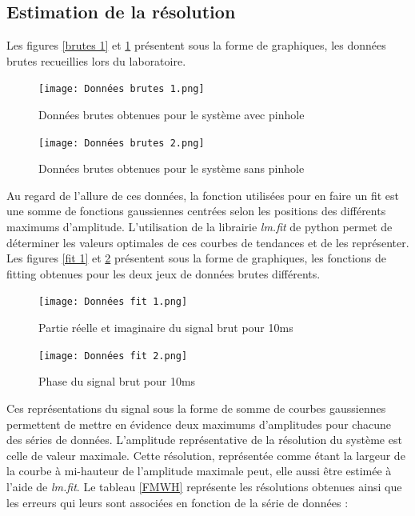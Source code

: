 \documentclass[11pt,letterpaper]{article}
\begin{document}
\subsection{Estimation de la résolution}

Les figures \ref{brutes 1} et \ref{brutes 2} présentent sous la forme de graphiques, les données brutes recueillies lors du laboratoire. 

\begin{figure}[h!]
    \centering
    \begin{minipage}[t]{0.46\linewidth}
        \centering
        \texttt{[image: Données brutes 1.png]}
        \caption{Données brutes obtenues pour le système avec pinhole}
        \label{brutes 1}
    \end{minipage}\hfill
    \begin{minipage}[t]{0.5\linewidth}
        \centering
        \texttt{[image: Données brutes 2.png]}
        \caption{Données brutes obtenues pour le système sans pinhole}
        \label{brutes 2}
    \end{minipage}

\end{figure}

Au regard de l'allure de ces données, la fonction utilisées pour en faire un fit est une somme de fonctions gaussiennes centrées selon les positions des différents maximums d'amplitude. L'utilisation de la librairie \textit{lm.fit} de python permet de déterminer les valeurs optimales de ces courbes de tendances et de les représenter. Les figures \ref{fit 1} et \ref{fit 2} présentent sous la forme de graphiques, les fonctions de fitting obtenues pour les deux jeux de données brutes différents. 

\begin{figure}[h!]
    \centering
    \begin{minipage}[t]{0.46\linewidth}
        \centering
        \texttt{[image: Données fit 1.png]}
        \caption{Partie réelle et imaginaire du signal brut pour 10ms}
        \label{fit 1}
    \end{minipage}\hfill
    \begin{minipage}[t]{0.5\linewidth}
        \centering
        \texttt{[image: Données fit 2.png]}
        \caption{Phase du signal brut pour 10ms}
        \label{fit 2}
    \end{minipage}
\end{figure}

Ces représentations du signal sous la forme de somme de courbes gaussiennes permettent de mettre en évidence deux maximums d'amplitudes pour chacune des séries de données. L'amplitude représentative de la résolution du système est celle de valeur maximale. Cette résolution, représentée comme étant la largeur de la courbe à mi-hauteur de l'amplitude maximale peut, elle aussi être estimée à l'aide de \textit{lm.fit}. Le tableau \ref{FMWH} représente les résolutions obtenues ainsi que les erreurs qui leurs sont associées en fonction de la série de données :
\end{document}
